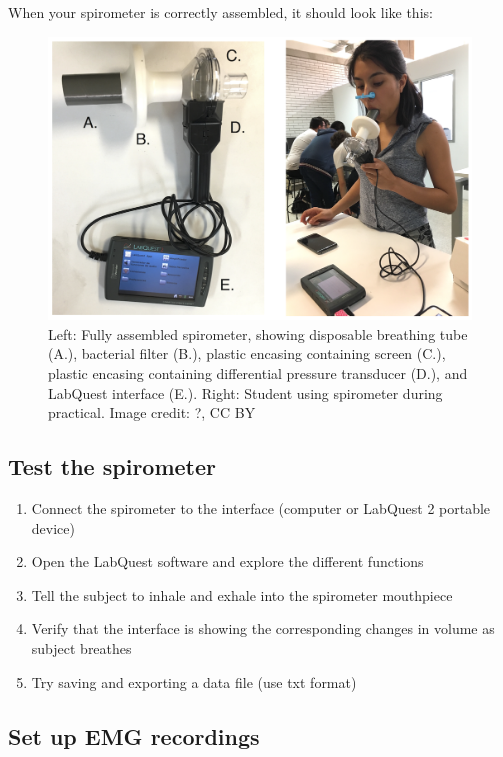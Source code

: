 \documentclass{article}
\begin{document}
When your spirometer is correctly assembled, it should look like this:

\begin{figure}[!htbp]
\centering
\includegraphics[width=0.9\linewidth]{files/EPpXta8zJdzN048lz8AR-f4be1a308ee19357af1b5f5ba845710b.png}
\caption[]{Left: Fully assembled spirometer, showing disposable breathing tube (A.), bacterial filter (B.), plastic encasing containing screen (C.), plastic encasing containing differential pressure transducer (D.), and LabQuest interface (E.). Right: Student using spirometer during practical. Image credit: ?, CC BY}
\label{xX2hgrmeU0}
\end{figure}

\subsection{Test the spirometer}

\begin{enumerate}
\item Connect the spirometer to the interface (computer or LabQuest 2 portable device)
\item Open the LabQuest software and explore the different functions
\item Tell the subject to inhale and exhale into the spirometer mouthpiece
\item Verify that the interface is showing the corresponding changes in volume as subject breathes
\item Try saving and exporting a data file (use txt format)
\end{enumerate}

\subsection{Set up EMG recordings}
\end{document}
